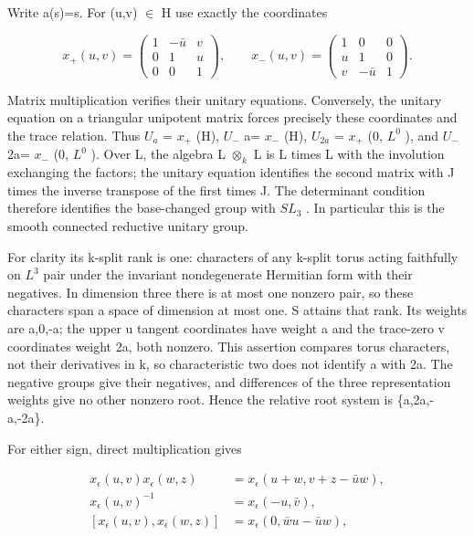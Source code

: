 \documentclass[
  11pt,
]{article}
\begin{document}
Write a(s)=s. For (u,v) \(\in\) H use exactly the coordinates

\[
 x_+(u,v)=\begin{pmatrix}1&-\bar u&v\\0&1&u\\0&0&1\end{pmatrix},
 \qquad
 x_-(u,v)=\begin{pmatrix}1&0&0\\u&1&0\\v&-\bar u&1\end{pmatrix}.
 \tag{BF.14}
\]

Matrix multiplication verifies their unitary equations. Conversely, the
unitary equation on a triangular unipotent matrix forces precisely these
coordinates and the trace relation. Thus \(U_{a}\) = \(x_{+}\) (H),
\(U_{-}\) a= \(x_{-}\) (H), \(U_{2a}\) = \(x_{+}\) (0, \(L^0\) ), and
\(U_{-}\) 2a= \(x_{-}\) (0, \(L^0\) ). Over L, the algebra L
\(\otimes_{k}\) L is L times L with the involution exchanging the
factors; the unitary equation identifies the second matrix with J times
the inverse transpose of the first times J. The determinant condition
therefore identifies the base-changed group with \(SL_{3}\) . In
particular this is the smooth connected reductive unitary group.

For clarity its k-split rank is one: characters of any k-split torus
acting faithfully on \(L^3\) pair under the invariant nondegenerate
Hermitian form with their negatives. In dimension three there is at most
one nonzero pair, so these characters span a space of dimension at most
one. S attains that rank. Its weights are a,0,-a; the upper u tangent
coordinates have weight a and the trace-zero v coordinates weight 2a,
both nonzero. This assertion compares torus characters, not their
derivatives in k, so characteristic two does not identify a with 2a. The
negative groups give their negatives, and differences of the three
representation weights give no other nonzero root. Hence the relative
root system is \{a,2a,-a,-2a\}.

For either sign, direct multiplication gives

\[
 \begin{aligned}
 x_\epsilon(u,v)x_\epsilon(w,z)
   &=x_\epsilon(u+w,v+z-\bar u w),\\
 x_\epsilon(u,v)^{-1}&=x_\epsilon(-u,\bar v),\\
 [x_\epsilon(u,v),x_\epsilon(w,z)]
   &=x_\epsilon(0,\bar w u-\bar u w),
 \end{aligned}
 \tag{BF.15}
\]
\end{document}
